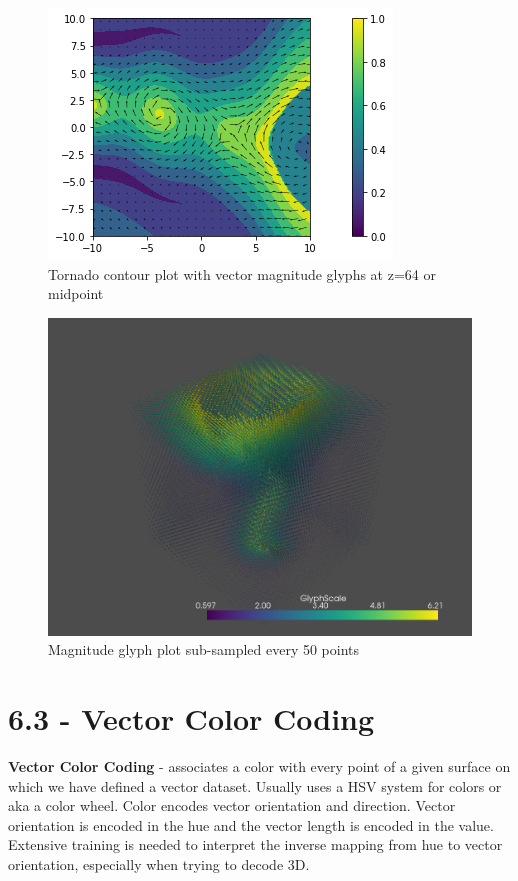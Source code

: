 \documentclass{article}
\begin{document}
\begin{figure}[H]
\caption{Tornado contour plot with vector magnitude glyphs at z=64 or midpoint}
\centering
\includegraphics[scale=0.55]{tornado_2d_contour_mid.png}
\end{figure}

\begin{figure}[H]
\caption{Magnitude glyph plot sub-sampled every 50 points }
\centering
\includegraphics[scale=.4]{tornado_glyph_sample_50.png}
\end{figure}

\section*{6.3 - Vector Color Coding}
\textbf{Vector Color Coding} - associates a color with every point of a given surface on which we have defined a vector dataset. Usually uses a HSV system for colors or aka a color wheel. Color encodes vector orientation and direction. Vector orientation is encoded in the hue and the vector length is encoded in the value. Extensive training is needed to interpret the inverse mapping from hue to vector orientation, especially when trying to decode 3D.
\end{document}
